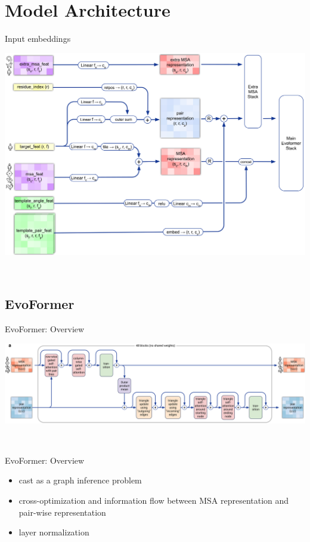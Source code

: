 \documentclass[presentation, smaller]{beamer}
\begin{document}
\section*{Model Architecture}
\label{sec:org1e1081a}
\begin{frame}[label={sec:orgba2eb21}]{Input embeddings}
\begin{center}
\includegraphics[width=.9\linewidth]{./imgs/input_embeddings.png}
\end{center}~\cite{jumperHighlyAccurateProtein2021}
\end{frame}


\subsection*{EvoFormer}
\label{sec:org2851ed6}

\begin{frame}[label={sec:org2a03b98}]{EvoFormer: Overview}
\begin{center}
\includegraphics[width=.9\linewidth]{./imgs/model-evoformer-main.png}
\end{center}~\cite{jumperHighlyAccurateProtein2021}
\end{frame}

\begin{frame}[label={sec:org1c20265}]{EvoFormer: Overview}
\begin{itemize}
\item cast as a graph inference problem
\item cross-optimization and information flow between MSA representation and pair-wise representation
\item layer normalization
\end{itemize}~\cite{jumperHighlyAccurateProtein2021}
\end{frame}
\end{document}

